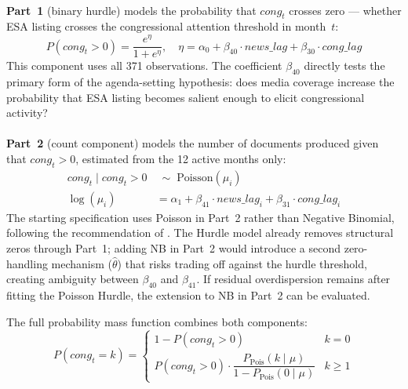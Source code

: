 \documentclass[11pt]{article}
\begin{document}
\\
\textbf{Part~1} (binary hurdle) models the probability that $\mathit{cong}_t$ crosses zero --- whether ESA listing crosses the congressional attention threshold in month~$t$:
\begin{equation}
  P(\mathit{cong}_t > 0)
    = \frac{e^{\eta}}{1+e^{\eta}}, \quad
  \eta = \alpha_0 + \beta_{40}\cdot\mathit{news\_lag}
                  + \beta_{30}\cdot\mathit{cong\_lag}
  \label{eq:hurdle1}
\end{equation}
This component uses all 371 observations. The coefficient $\beta_{40}$ directly tests the primary form of the agenda-setting hypothesis: does media coverage increase the probability that ESA listing becomes salient
enough to elicit congressional activity?\\
\\
\textbf{Part~2} (count component) models the number of documents produced given that $\mathit{cong}_t > 0$, estimated from the 12 active months only:
\begin{align}
  \mathit{cong}_t \mid \mathit{cong}_t > 0
    &\;\sim\; \mathrm{Poisson}(\mu_i)
  \label{eq:hurdle2a}\\
  \log(\mu_i)
    &= \alpha_1 + \beta_{41} \cdot \mathit{news\_lag}_i
                + \beta_{31} \cdot \mathit{cong\_lag}_i
  \label{eq:hurdle2b}
\end{align}
The starting specification uses Poisson in Part~2 rather than Negative Binomial, following the recommendation of \citet{Zeileis2008}. The Hurdle model already removes structural zeros through Part~1; adding NB
in Part~2 would introduce a second zero-handling mechanism ($\hat{\theta}$) that risks trading off against the hurdle threshold, creating ambiguity between $\beta_{40}$ and $\beta_{41}$. If residual overdispersion
remains after fitting the Poisson Hurdle, the extension to NB in Part~2 can be evaluated.

The full probability mass function combines both components:
\begin{equation}
  P(\mathit{cong}_t = k) =
  \begin{cases}
    1 - P(\mathit{cong}_t>0) & k=0\\[4pt]
    P(\mathit{cong}_t>0)\cdot
    \dfrac{P_{\mathrm{Pois}}(k\mid\mu)}
          {1-P_{\mathrm{Pois}}(0\mid\mu)}
    & k \geq 1
  \end{cases}
  \label{eq:hurdle_pmf}
\end{equation}
\end{document}
